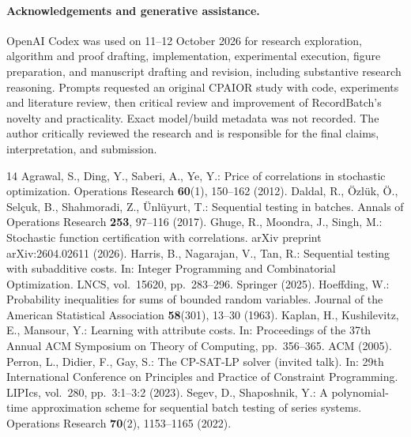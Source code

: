 \documentclass[runningheads]{llncs}
\begin{document}
\paragraph{Acknowledgements and generative assistance.}
OpenAI Codex was used on 11--12 October 2026 for research exploration,
algorithm and proof drafting, implementation, experimental execution,
figure preparation, and manuscript drafting and revision, including substantive
research reasoning. Prompts requested an original CPAIOR study with code,
experiments and literature review, then critical review and improvement of
RecordBatch's novelty and practicality. Exact model/build metadata was not
recorded. The author critically reviewed the research and is responsible for
the final claims, interpretation, and submission.

\begin{thebibliography}{14}
Agrawal, S., Ding, Y., Saberi, A., Ye, Y.:
Price of correlations in stochastic optimization.
Operations Research \textbf{60}(1), 150--162 (2012).
Daldal, R., \"Ozl\"uk, \"O., Sel\c{c}uk, B., Shahmoradi, Z., \"Unl\"uyurt, T.:
Sequential testing in batches.
Annals of Operations Research \textbf{253}, 97--116 (2017).
Ghuge, R., Moondra, J., Singh, M.:
Stochastic function certification with correlations.
arXiv preprint arXiv:2604.02611 (2026).
Harris, B., Nagarajan, V., Tan, R.:
Sequential testing with subadditive costs.
In: Integer Programming and Combinatorial Optimization.
LNCS, vol.~15620, pp.~283--296. Springer (2025).
Hoeffding, W.:
Probability inequalities for sums of bounded random variables.
Journal of the American Statistical Association \textbf{58}(301), 13--30 (1963).
Kaplan, H., Kushilevitz, E., Mansour, Y.:
Learning with attribute costs.
In: Proceedings of the 37th Annual ACM Symposium on Theory of Computing,
pp.~356--365. ACM (2005).
Perron, L., Didier, F., Gay, S.:
The CP-SAT-LP solver (invited talk).
In: 29th International Conference on Principles and Practice of Constraint
Programming. LIPIcs, vol.~280, pp.~3:1--3:2 (2023).
Segev, D., Shaposhnik, Y.:
A polynomial-time approximation scheme for sequential batch testing of
series systems.
Operations Research \textbf{70}(2), 1153--1165 (2022).

\end{thebibliography}
\end{document}
